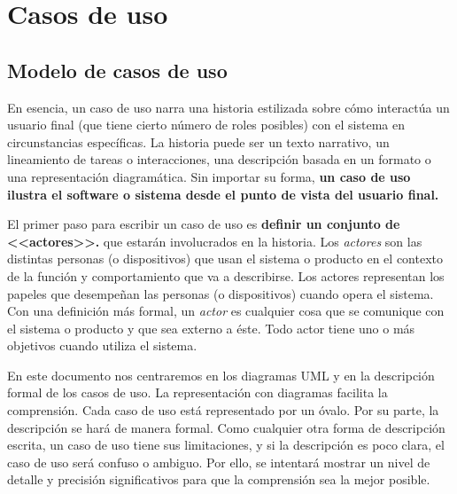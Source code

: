 \documentclass[a4paper,oneside,11pt]{book}
\begin{document}
	
\chapter{Casos de uso} %
	\label{cha:casos_de_uso}

% 
%
\section{Modelo de casos de uso} %
	\label{sec:modelo_casos_de_uso}
	
		En esencia, un caso de uso narra una historia estilizada sobre cómo interactúa un usuario final (que tiene cierto número de roles posibles) con el sistema en circunstancias específicas. La historia puede ser un texto narrativo, un lineamiento de tareas o interacciones, una descripción basada en un formato o una representación diagramática. Sin importar su forma, \textbf{un caso de uso ilustra el software o sistema desde el punto de vista del usuario final.}
		
		\medskip
		
		\medskip		
		El primer paso para escribir un caso de uso es \textbf{definir un conjunto de <<actores>>.} que estarán involucrados en la historia. Los \textit{actores} son las distintas personas (o dispositivos) que usan el sistema o producto en el contexto de la función y comportamiento que va a describirse. Los actores representan los papeles que desempeñan las personas (o dispositivos) cuando opera el sistema. Con una definición más formal, un \textit{actor} es cualquier cosa que se comunique con el sistema o producto y que sea externo a éste. Todo actor tiene uno o más objetivos cuando utiliza el sistema.
		
		 En este documento nos centraremos en los diagramas UML y en la descripción formal de los casos de uso. La representación con diagramas facilita la comprensión. Cada caso de uso está representado por un óvalo. Por su parte, la descripción se hará de manera formal. Como cualquier otra forma de descripción escrita, un caso de uso tiene sus limitaciones, y si la descripción es poco clara, el caso de uso será confuso o ambiguo. Por ello, se intentará mostrar un nivel de detalle y precisión significativos para que la comprensión sea la mejor posible.
		
\end{document}
